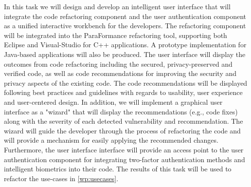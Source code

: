 \begin{Workpackage}{\thewpno}
\begin{WPDescription}
\end{WPDescription}

\begin{Task}
\TaskResults{%
}
\TaskHeader{}
In this task we will design and develop an intelligent user interface that will integrate the code refactoring component and the user authentication component as a unified interactive workbench for the developers. The refactoring component will be integrated into the ParaFormance refactoring tool, supporting both Eclipse and Visual-Studio for C++ applications. A prototype implementation for Java-based applications will also be produced. The user interface will display the outcomes from code refactoring including the secured, privacy-preserved and verified code, as well as code recommendations for improving the security and privacy aspects of the existing code. The code recommendations will be displayed following best practices and guidelines with regards to usability, user experience and user-centered design. In addition, we will implement a graphical user interface as a "wizard" that will display the recommendations (e.g., code fixes) along with the severity of each detected vulnerability and recommendation. The wizard will guide the developer through the process of refactoring the code and will provide a mechanism for easily applying the recommended changes. Furthermore, the user interface interface will provide an access point to the user authentication component for integrating two-factor authentication methods and intelligent biometrics into their code. The results of this task will be used to refactor the use-cases in \ref{wp:usecases}.



%
%
\end{Task}


\end{Workpackage}

